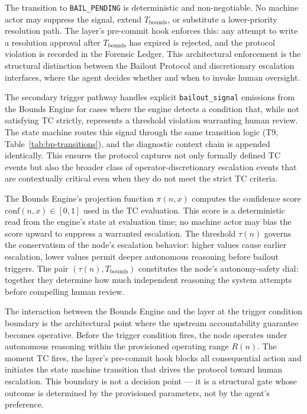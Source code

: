 The transition to \texttt{BAIL\_PENDING} is deterministic and
non-negotiable.  No machine actor may suppress the signal, extend
$T_{\text{bounds}}$, or substitute a lower-priority resolution path.  The
\fact{} layer's pre-commit hook enforces this: any attempt to write a
resolution approval after $T_{\text{bounds}}$ has expired is rejected, and
the protocol violation is recorded in the Forensic Ledger.  This architectural
enforcement is the structural distinction between the Bailout Protocol and
discretionary escalation interfaces, where the agent decides whether and when
to invoke human oversight.

The secondary trigger pathway handles explicit \texttt{bailout\_signal}
emissions from the Bounds Engine for cases where the engine detects a
condition that, while not satisfying TC strictly, represents a threshold
violation warranting human review.  The state machine routes this signal
through the same transition logic (T9, Table~\ref{tab:bp-transitions}), and
the diagnostic context chain is appended identically.  This ensures the
protocol captures not only formally defined TC events but also the broader
class of operator-discretionary escalation events that are contextually
critical even when they do not meet the strict TC criteria.

The Bounds Engine's projection function $\pi(n, x)$ computes the confidence
score $\text{conf}(n, x) \in [0, 1]$ used in the TC evaluation.  This score is
a deterministic read from the engine's state at evaluation time; no machine
actor may bias the score upward to suppress a warranted escalation.  The
threshold $\tau(n)$ governs the conservatism of the node's escalation
behavior: higher values cause earlier escalation, lower values permit deeper
autonomous reasoning before bailout triggers.  The pair
$(\tau(n), T_{\text{bounds}})$ constitutes the node's autonomy-safety dial:
together they determine how much independent reasoning the system attempts
before compelling human review.

The interaction between the Bounds Engine and the \fact{} layer at the
trigger condition boundary is the architectural point where the upstream
accountability guarantee becomes operative.  Before the trigger condition
fires, the node operates under autonomous reasoning within the provisioned
operating range $R(n)$.  The moment TC fires, the \fact{} layer's pre-commit
hook blocks all consequential action and initiates the state machine
transition that drives the protocol toward human escalation.  This boundary
is not a decision point --- it is a structural gate whose outcome is determined
by the provisioned parameters, not by the agent's preference.

